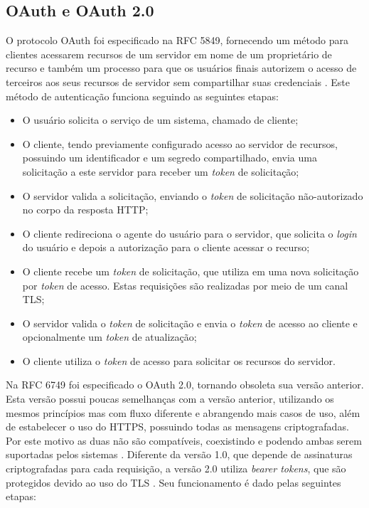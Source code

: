 \subsection{OAuth e OAuth 2.0}

O protocolo OAuth foi especificado na RFC 5849, fornecendo um método para clientes acessarem 
recursos de um servidor em nome de um proprietário de recurso e também um processo para que os 
usuários finais autorizem o acesso de terceiros aos seus recursos de servidor sem compartilhar suas
credenciais \cite{RFC5849}. Este método de autenticação funciona seguindo as seguintes etapas:

\begin{itemize}
\item O usuário solicita o serviço de um sistema, chamado de cliente;
\item O cliente, tendo previamente configurado acesso ao servidor de recursos, possuindo um 
identificador e um segredo compartilhado, envia uma solicitação a este servidor para receber um 
\emph{token} de solicitação;
\item O servidor valida a solicitação, enviando o \emph{token} de solicitação não-autorizado no 
corpo da resposta HTTP;
\item O cliente redireciona o agente do usuário para o servidor, que solicita o \emph{login} do 
usuário e depois a autorização para o cliente acessar o recurso;
\item O cliente recebe um \emph{token} de solicitação, que utiliza em uma nova solicitação por 
\emph{token} de acesso. Estas requisições são realizadas por meio de um canal TLS;
\item O servidor valida o \emph{token} de solicitação e envia o \emph{token} de acesso ao cliente e 
opcionalmente um \emph{token} de atualização;
\item O cliente utiliza o \emph{token} de acesso para solicitar os recursos do servidor.
\end{itemize}

Na RFC 6749 foi especificado o OAuth 2.0, tornando obsoleta sua versão anterior. Esta versão possui 
poucas semelhanças com a versão anterior, utilizando os mesmos princípios mas com fluxo diferente e 
abrangendo mais casos de uso, além de estabelecer o uso do HTTPS, possuindo todas as mensagens 
criptografadas. Por este motivo as duas não são compatíveis, coexistindo e podendo ambas serem 
suportadas pelos sistemas \cite{RFC6749}. Diferente da versão 1.0, que depende de assinaturas 
criptografadas para cada requisição, a versão 2.0 utiliza \emph{bearer tokens}, que são protegidos 
devido ao uso do TLS \cite{SIRIWARDENA2014}. Seu funcionamento é dado pelas seguintes etapas:


